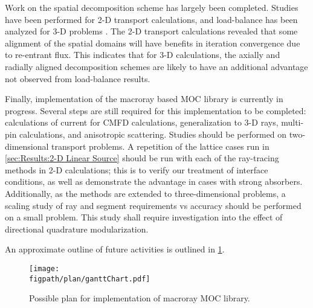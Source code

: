 {{        Work on the spatial decomposition scheme has largely been completed.
        Studies have been performed for 2-D transport calculations, and load-balance has been analyzed for 3-D problems \cite{Fitzgerald2019a}.
        The 2-D transport calculations revealed that some alignment of the spatial domains will have benefits in iteration convergence due to re-entrant flux.
        This indicates that for 3-D calculations, the axially and radially aligned decomposition schemes are likely to have an additional advantage not observed from load-balance results.

        Finally, implementation of the macroray based \ac{MOC} library is currently in progress.
        Several steps are still required for this implementation to be completed: calculations of current for \ac{CMFD} calculations, generalization to 3-D rays, multi-pin calculations, and anisotropic scattering.
        Studies should be performed on two-dimensional transport problems.
        A repetition of the lattice cases run in \cref{sec:Results:2-D Linear Source} should be run with each of the ray-tracing methods in 2-D calculations; this is to verify our treatment of interface conditions, as well as demonstrate the advantage in cases with strong absorbers.
        Additionally, as the methods are extended to three-dimensional problems, a scaling study of ray and segment requirements vs accuracy should be performed on a small problem.
        This study shall require investigation into the effect of directional quadrature modularization.

        An approximate outline of future activities is outlined in \cref{fig:Implementation Plan}.
        \begin{figure}[h]
            \centering
            \texttt{[image: \\figpath/plan/ganttChart.pdf]}
            \caption{Possible plan for implementation of macroray \ac{MOC} library.}
            \label{fig:Implementation Plan}
        \end{figure}


    }
}